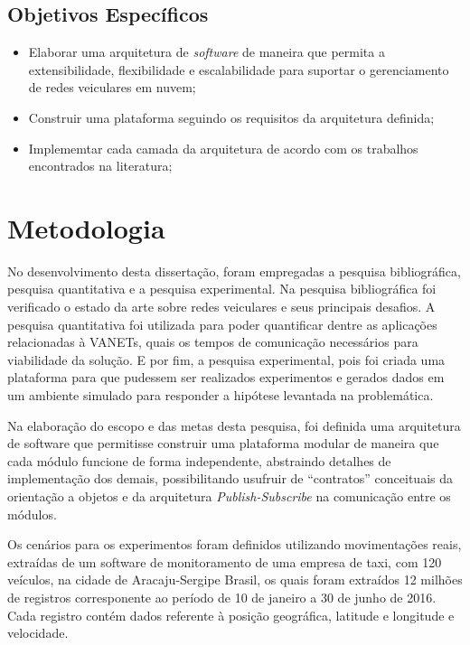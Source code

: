 \documentclass[
	12pt,				%
	oneside,			%
	a4paper,			%
	english,			%
	brazil				%
	]{abntex2ppgsi}
\begin{document}
\subsection{Objetivos Específicos}
\begin{itemize}
	\item{Elaborar uma arquitetura de \textit{software} de maneira que permita a extensibilidade, flexibilidade e escalabilidade para suportar o gerenciamento de redes veiculares em nuvem;}	
	\item{Construir uma plataforma seguindo os requisitos da arquitetura definida;}	
	\item{Implememtar cada camada da arquitetura de acordo com os trabalhos encontrados na literatura;}	
\end{itemize} 

\section{Metodologia}

No desenvolvimento desta dissertação, foram empregadas a pesquisa bibliográfica, pesquisa quantitativa e a pesquisa experimental. Na pesquisa bibliográfica foi verificado o estado da arte sobre redes veiculares e seus principais desafios. A pesquisa quantitativa foi utilizada para poder quantificar dentre as aplicações relacionadas à VANETs, quais os tempos de comunicação necessários para viabilidade da solução. E por fim, a pesquisa experimental, pois foi criada uma plataforma para que pudessem ser realizados experimentos e gerados dados em um ambiente simulado para responder a hipótese levantada na problemática.

Na elaboração do escopo e das metas desta pesquisa, foi definida uma arquitetura de software que permitisse construir uma plataforma modular de maneira que cada módulo funcione de forma independente, abstraindo detalhes de implementação dos demais, possibilitando usufruir de ``contratos'' conceituais da orientação a objetos e da arquitetura \textit{Publish-Subscribe} na comunicação entre os módulos.

Os cenários para os experimentos foram definidos utilizando movimentações reais, extraídas de um software de monitoramento de uma empresa de taxi, com 120 veículos, na cidade de Aracaju-Sergipe Brasil, os quais foram extraídos 12 milhões de registros corresponente ao período de 10 de janeiro a 30 de junho de 2016. Cada registro contém dados referente à posição geográfica, latitude e longitude e velocidade.
\end{document}
